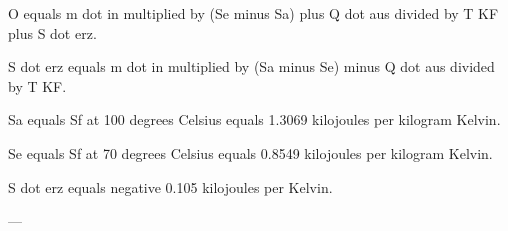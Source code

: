 O equals m dot in multiplied by (Se minus Sa) plus Q dot aus divided by T KF plus S dot erz.  

S dot erz equals m dot in multiplied by (Sa minus Se) minus Q dot aus divided by T KF.  

Sa equals Sf at 100 degrees Celsius equals 1.3069 kilojoules per kilogram Kelvin.  

Se equals Sf at 70 degrees Celsius equals 0.8549 kilojoules per kilogram Kelvin.  

S dot erz equals negative 0.105 kilojoules per Kelvin.  

---